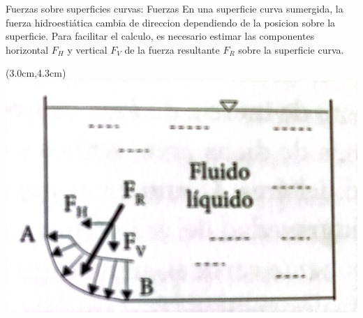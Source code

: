 \documentclass [xcolor=svgnames, t] {beamer}
\begin{document}
\begin{frame}{Fuerzas sobre superficies curvas: Fuerzas}
En una superficie curva sumergida, la fuerza hidroesti\'atica cambia de direccion dependiendo de la posicion sobre la superficie. Para facilitar el calculo, es necesario estimar las componentes horizontal $F_H$ y vertical $F_V$ de  la fuerza resultante $F_R$ sobre la superficie curva. 
\begin{textblock*}{6.5cm}(3.0cm,4.3cm) %
\includegraphics[width=\textwidth]{curb2}
\end{textblock*}
\end{frame}
\end{document}
